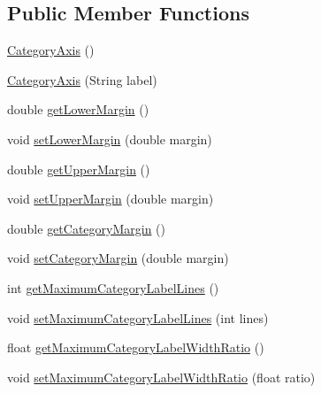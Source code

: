 \subsection*{Public Member Functions}
\begin{DoxyCompactItemize}
\item 
\mbox{\hyperlink{classorg_1_1jfree_1_1chart_1_1axis_1_1_category_axis_a10388d2d7cb39a25bddb6249582c5bb2}{Category\+Axis}} ()
\item 
\mbox{\hyperlink{classorg_1_1jfree_1_1chart_1_1axis_1_1_category_axis_aee5d96d626dc4692ad182110c0c95e22}{Category\+Axis}} (String label)
\item 
double \mbox{\hyperlink{classorg_1_1jfree_1_1chart_1_1axis_1_1_category_axis_aa43dece7ed3eeb9179b874befee56d0f}{get\+Lower\+Margin}} ()
\item 
void \mbox{\hyperlink{classorg_1_1jfree_1_1chart_1_1axis_1_1_category_axis_a88698d2061063cb5172c363be686b115}{set\+Lower\+Margin}} (double margin)
\item 
double \mbox{\hyperlink{classorg_1_1jfree_1_1chart_1_1axis_1_1_category_axis_a3495765b4523a50ae7e352292bdb3ae4}{get\+Upper\+Margin}} ()
\item 
void \mbox{\hyperlink{classorg_1_1jfree_1_1chart_1_1axis_1_1_category_axis_ac33882eb8c882b5d1750d349870fce65}{set\+Upper\+Margin}} (double margin)
\item 
double \mbox{\hyperlink{classorg_1_1jfree_1_1chart_1_1axis_1_1_category_axis_a7f3b48c2323a993c49433577000f4daa}{get\+Category\+Margin}} ()
\item 
void \mbox{\hyperlink{classorg_1_1jfree_1_1chart_1_1axis_1_1_category_axis_ae0b9ff86039cece69e084ba53823f7d7}{set\+Category\+Margin}} (double margin)
\item 
int \mbox{\hyperlink{classorg_1_1jfree_1_1chart_1_1axis_1_1_category_axis_a9f982c4d5747dad3f3c1580ffaa90104}{get\+Maximum\+Category\+Label\+Lines}} ()
\item 
void \mbox{\hyperlink{classorg_1_1jfree_1_1chart_1_1axis_1_1_category_axis_a04818cb638781c835730b6d0fc64f468}{set\+Maximum\+Category\+Label\+Lines}} (int lines)
\item 
float \mbox{\hyperlink{classorg_1_1jfree_1_1chart_1_1axis_1_1_category_axis_a0c0286d9bf8c1fc7250d44b67969ab6a}{get\+Maximum\+Category\+Label\+Width\+Ratio}} ()
\item 
void \mbox{\hyperlink{classorg_1_1jfree_1_1chart_1_1axis_1_1_category_axis_a24e3faae5e1ef3bd29147892dda79c27}{set\+Maximum\+Category\+Label\+Width\+Ratio}} (float ratio)
\item 

\end{DoxyCompactItemize}
